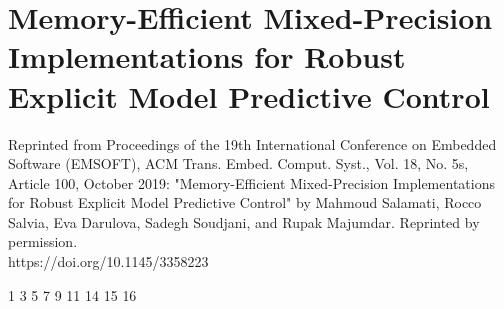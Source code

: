 
\chapter{Memory-Efficient Mixed-Precision Implementations for Robust Explicit Model Predictive Control}
\label{sec:emsoft}
Reprinted from Proceedings of the 19th International Conference on Embedded Software (EMSOFT), ACM Trans. Embed. Comput. Syst., Vol. 18, No. 5s, Article 100, October 2019: "Memory-Efficient Mixed-Precision Implementations for Robust Explicit Model Predictive Control" by Mahmoud Salamati, Rocco Salvia, Eva Darulova, Sadegh Soudjani, and Rupak Majumdar. Reprinted by permission.\\
https://doi.org/10.1145/3358223

\setupuuchapterbib

                              {1}
                            		{3}
       							{5}
                      		{7}
						{9}
                      {11}
       						{14}
                      			{15}
                              	{16}


